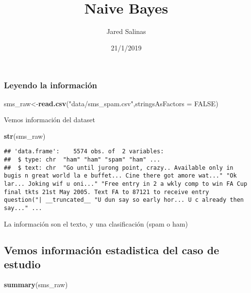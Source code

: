 \documentclass[]{article}
\title{Naive Bayes}
\author{Jared Salinas}
\date{21/1/2019}
\newenvironment{Shaded}{\begin{snugshade}}{\end{snugshade}}
\newcommand{\KeywordTok}[1]{\textcolor[rgb]{0.13,0.29,0.53}{\textbf{#1}}}
\newcommand{\DataTypeTok}[1]{\textcolor[rgb]{0.13,0.29,0.53}{#1}}
\newcommand{\StringTok}[1]{\textcolor[rgb]{0.31,0.60,0.02}{#1}}
\newcommand{\OtherTok}[1]{\textcolor[rgb]{0.56,0.35,0.01}{#1}}
\newcommand{\NormalTok}[1]{#1}
\begin{document}
\maketitle

\subsubsection{Leyendo la información}\label{leyendo-la-informacion}

\begin{Shaded}
\begin{Highlighting}[]
\NormalTok{sms_raw<-}\KeywordTok{read.csv}\NormalTok{(}\StringTok{"data/sms_spam.csv"}\NormalTok{,}\DataTypeTok{stringsAsFactors =} \OtherTok{FALSE}\NormalTok{)}
\end{Highlighting}
\end{Shaded}

Vemos información del dataset

\begin{Shaded}
\begin{Highlighting}[]
\KeywordTok{str}\NormalTok{(sms_raw)}
\end{Highlighting}
\end{Shaded}

\begin{verbatim}
## 'data.frame':    5574 obs. of  2 variables:
##  $ type: chr  "ham" "ham" "spam" "ham" ...
##  $ text: chr  "Go until jurong point, crazy.. Available only in bugis n great world la e buffet... Cine there got amore wat..." "Ok lar... Joking wif u oni..." "Free entry in 2 a wkly comp to win FA Cup final tkts 21st May 2005. Text FA to 87121 to receive entry question("| __truncated__ "U dun say so early hor... U c already then say..." ...
\end{verbatim}

La información son el texto, y una clasificación (spam o ham)

\subsection{Vemos información estadistica del caso de
estudio}\label{vemos-informacion-estadistica-del-caso-de-estudio}

\begin{Shaded}
\begin{Highlighting}[]
\KeywordTok{summary}\NormalTok{(sms_raw)}
\end{Highlighting}
\end{Shaded}
\end{document}
